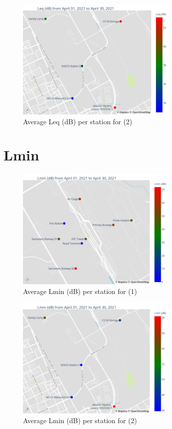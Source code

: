\documentclass[12pt, oneside]{book}
\begin{document}
{\begin{figure}[H]
\centering
\qquad\includegraphics[width=0.7\textwidth, keepaspectratio]{image4}
\caption{Average Leq (dB) per station for \monthyear (2)}\label{image4}
\end{figure}}{}


\section{Lmin}

{\begin{figure}[H]
\centering
\qquad\includegraphics[width=0.7\textwidth, keepaspectratio]{image2}
\caption{Average Lmin (dB) per station for \monthyear (1)}\label{image2}
\end{figure}}{}

{\begin{figure}[H]
\centering
\qquad\includegraphics[width=0.7\textwidth, keepaspectratio]{image5}
\caption{Average Lmin (dB) per station for \monthyear (2)}\label{image5}
\end{figure}}{}
\end{document}
